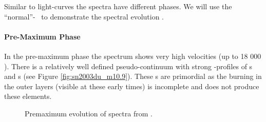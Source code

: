 Similar to light-curves the spectra have different phases. We will use the ``normal''-\snia\  to demonstrate the spectral evolution \citep{2011MNRAS.410.1725T}. 

\paragraph{Pre-Maximum Phase}
In the pre-maximum phase the spectrum shows very high velocities (up to 18 000 \kms). There is a relatively well defined pseudo-continuum with strong \pcygni-profiles of \ime s and \ige s (see Figure \ref{fig:sn2003du_m10.9}). These \ige s are primordial as the burning in the outer layers (visible at these early times) is incomplete and does not produce these elements. 


\begin{figure}[htbp] %
   \centering
   \caption{Premaximum evolution of  spectra from \cite{2011MNRAS.410.1725T}.}
   \label{fig:sn2003du_premax}
\end{figure}

